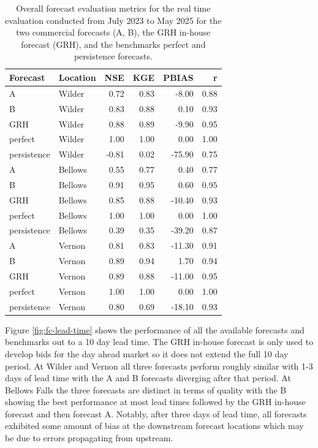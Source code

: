 \documentclass[MLA,Times1COL, hidelinks, doublespace]{WileyNJDv5} %
\begin{document}
\begin{table}[ht]
\centering
\caption{Overall forecast evaluation metrics for the real time evaluation conducted from July 2023 to May 2025 for the two commercial forecasts (A, B), the GRH in-house forecast (GRH), and the benchmarks perfect and persistence forecasts.}\label{tab:metrics}
\begin{tabular}{llrrrr}
  \hline
Forecast & Location & NSE & KGE & PBIAS & r \\ 
  \hline
A            & Wilder     & 0.72  & 0.83  & -8.00    & 0.88 \\
B            & Wilder     & 0.83  & 0.88  & 0.10     & 0.93 \\
GRH          & Wilder     & 0.88  & 0.89  & -9.90    & 0.95 \\
perfect      & Wilder     & 1.00  & 1.00  & 0.00     & 1.00 \\
persistence  & Wilder     & -0.81 & 0.02  & -75.90   & 0.75 \\
A            & Bellows    & 0.55  & 0.77  & 0.40     & 0.77 \\
B            & Bellows    & 0.91  & 0.95  & 0.60     & 0.95 \\
GRH          & Bellows    & 0.85  & 0.88  & -10.40   & 0.93 \\
perfect      & Bellows    & 1.00  & 1.00  & 0.00     & 1.00 \\
persistence  & Bellows    & 0.39  & 0.35  & -39.20   & 0.87 \\
A            & Vernon     & 0.81  & 0.83  & -11.30   & 0.91 \\
B            & Vernon     & 0.89  & 0.94  & 1.70     & 0.94 \\
GRH          & Vernon     & 0.89  & 0.88  & -11.00   & 0.95 \\
perfect      & Vernon     & 1.00  & 1.00  & 0.00     & 1.00 \\
persistence  & Vernon     & 0.80  & 0.69  & -18.10   & 0.93 \\
   \hline
\end{tabular}
\end{table}

Figure \ref{fig:fc-lead-time} shows the performance of all the available forecasts and benchmarks out to a 10 day lead time. The GRH in-house forecast is only used to develop bids for the day ahead market so it does not extend the full 10 day period. At Wilder and Vernon all three forecasts perform roughly similar with 1-3 days of lead time with the A and B forecasts diverging after that period. At Bellows Falls the three forecasts are distinct in terms of quality with the B showing the best performance at most lead times followed by the GRH in-house forecast and then forecast A. Notably, after three days of lead time, all forecasts exhibited some amount of bias at the downstream forecast locations which may be due to errors propagating from upstream. 
\end{document}
